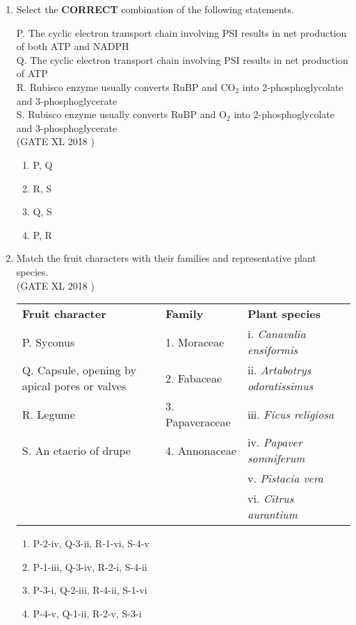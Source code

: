 \documentclass[14pt]{extarticle}
\begin{document}
\begin{flushleft}
\begin{enumerate}[leftmargin=*]
    \item Select the \textbf{CORRECT} combination of the following statements.  

    P. The cyclic electron transport chain involving PSI results in net production of both ATP and NADPH \\
    Q. The cyclic electron transport chain involving PSI results in net production of ATP \\
    R. Rubisco enzyme usually converts RuBP and CO$_2$ into 2-phosphoglycolate and 3-phosphoglycerate \\
    S. Rubisco enzyme usually converts RuBP and O$_2$ into 2-phosphoglycolate and 3-phosphoglycerate\\
    \hfill(GATE XL 2018 )
    \begin{multicols}{2}
    \begin{enumerate}
        \item P, Q
        \item R, S
        \item Q, S
        \item P, R
    \end{enumerate}
    \end{multicols}

\item Match the fruit characters with their families and representative plant species.\\
\hfill(GATE XL 2018 )

\begin{tabular}{p{4cm} p{4cm} p{6cm}}
\textbf{Fruit character} & \textbf{Family} & \textbf{Plant species} \\
P. Syconus & 1. Moraceae & i. \textit{Canavalia ensiformis} \\
Q. Capsule, opening by apical pores or valves & 2. Fabaceae & ii. \textit{Artabotrys odoratissimus} \\
R. Legume & 3. Papaveraceae & iii. \textit{Ficus religiosa} \\
S. An etaerio of drupe & 4. Annonaceae & iv. \textit{Papaver somniferum} \\
 & & v. \textit{Pistacia vera} \\
 & & vi. \textit{Citrus aurantium} \\
\end{tabular}

\begin{enumerate}
    \item P-2-iv, Q-3-ii, R-1-vi, S-4-v
    \item P-1-iii, Q-3-iv, R-2-i, S-4-ii
    \item P-3-i, Q-2-iii, R-4-ii, S-1-vi
    \item P-4-v, Q-1-ii, R-2-v, S-3-i
\end{enumerate}



\end{enumerate}
\end{flushleft}
\end{document}

